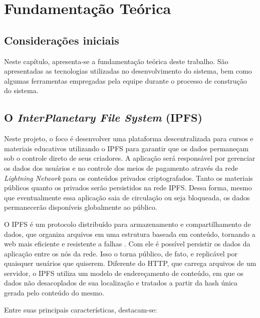 \chapter[Fundamentação Teórica]{Fundamentação Teórica}

\section{Considerações iniciais}

Neste capítulo, apresenta-se a fundamentação teórica deste trabalho. São apresentadas as tecnologias utilizadas no desenvolvimento do sistema, bem como algumas ferramentas empregadas pela equipe durante o processo de construção do sistema.

\section{O \textit{InterPlanetary File System} (IPFS)}

Neste projeto, o foco é desenvolver uma plataforma descentralizada para cursos e materiais educativos utilizando o IPFS para garantir que os dados permaneçam sob o controle direto de seus criadores. A aplicação será responsável por gerenciar os dados dos usuários e no controle dos meios de pagamento através da rede \textit{Lightning Network} \cite{lightningnetwork} para os conteúdos privados criptografados. Tanto os materiais públicos quanto os privados serão persistidos na rede IPFS. Dessa forma, mesmo que eventualmente essa aplicação saia de circulação ou seja bloqueada, os dados permanecerão disponíveis globalmente ao público.

O IPFS é um protocolo distribuído para armazenamento e compartilhamento de dados, que organiza arquivos em uma estrutura baseada em conteúdo, tornando a web mais eficiente e resistente a falhas \cite{ipfs2025}. Com ele é possível persistir os dados da aplicação entre os nós da rede. Isso o torna público, de fato, e replicável por quaisquer usuários que quiserem. Diferente do HTTP, que carrega arquivos de um servidor, o IPFS utiliza um modelo de endereçamento de conteúdo, em que os dados não desacoplados de sua localização e tratados a partir da hash única gerada pelo conteúdo do mesmo.

Entre suas principais características, destacam-se:

